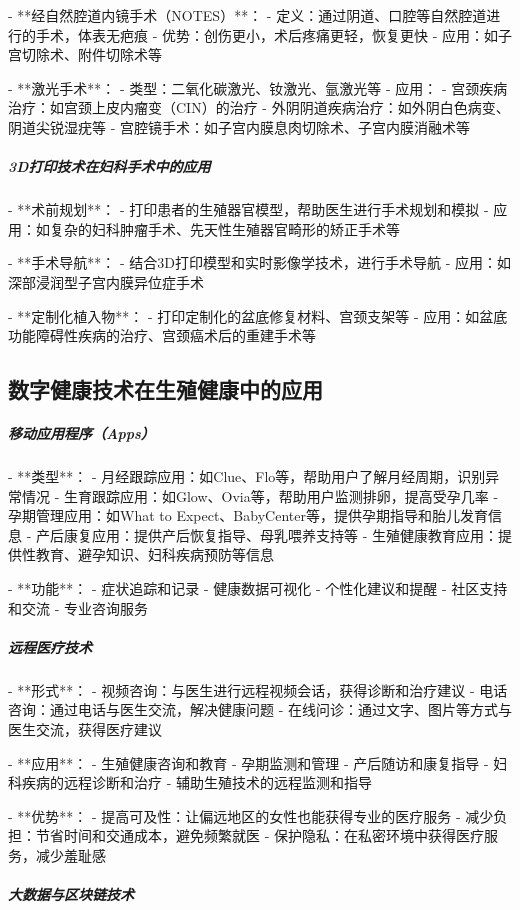 \begin{enumerate}
- **经自然腔道内镜手术（NOTES）**：
  - 定义：通过阴道、口腔等自然腔道进行的手术，体表无疤痕
  - 优势：创伤更小，术后疼痛更轻，恢复更快
  - 应用：如子宫切除术、附件切除术等

- **激光手术**：
  - 类型：二氧化碳激光、钕激光、氩激光等
  - 应用：
    - 宫颈疾病治疗：如宫颈上皮内瘤变（CIN）的治疗
    - 外阴阴道疾病治疗：如外阴白色病变、阴道尖锐湿疣等
    - 宫腔镜手术：如子宫内膜息肉切除术、子宫内膜消融术等

\subparagraph{3D打印技术在妇科手术中的应用}

- **术前规划**：
  - 打印患者的生殖器官模型，帮助医生进行手术规划和模拟
  - 应用：如复杂的妇科肿瘤手术、先天性生殖器官畸形的矫正手术等

- **手术导航**：
  - 结合3D打印模型和实时影像学技术，进行手术导航
  - 应用：如深部浸润型子宫内膜异位症手术

- **定制化植入物**：
  - 打印定制化的盆底修复材料、宫颈支架等
  - 应用：如盆底功能障碍性疾病的治疗、宫颈癌术后的重建手术等

\subsection{数字健康技术在生殖健康中的应用}

\subparagraph{移动应用程序（Apps）}

- **类型**：
  - 月经跟踪应用：如Clue、Flo等，帮助用户了解月经周期，识别异常情况
  - 生育跟踪应用：如Glow、Ovia等，帮助用户监测排卵，提高受孕几率
  - 孕期管理应用：如What to Expect、BabyCenter等，提供孕期指导和胎儿发育信息
  - 产后康复应用：提供产后恢复指导、母乳喂养支持等
  - 生殖健康教育应用：提供性教育、避孕知识、妇科疾病预防等信息

- **功能**：
  - 症状追踪和记录
  - 健康数据可视化
  - 个性化建议和提醒
  - 社区支持和交流
  - 专业咨询服务

\subparagraph{远程医疗技术}

- **形式**：
  - 视频咨询：与医生进行远程视频会话，获得诊断和治疗建议
  - 电话咨询：通过电话与医生交流，解决健康问题
  - 在线问诊：通过文字、图片等方式与医生交流，获得医疗建议

- **应用**：
  - 生殖健康咨询和教育
  - 孕期监测和管理
  - 产后随访和康复指导
  - 妇科疾病的远程诊断和治疗
  - 辅助生殖技术的远程监测和指导

- **优势**：
  - 提高可及性：让偏远地区的女性也能获得专业的医疗服务
  - 减少负担：节省时间和交通成本，避免频繁就医
  - 保护隐私：在私密环境中获得医疗服务，减少羞耻感

\subparagraph{大数据与区块链技术}


\end{enumerate}
